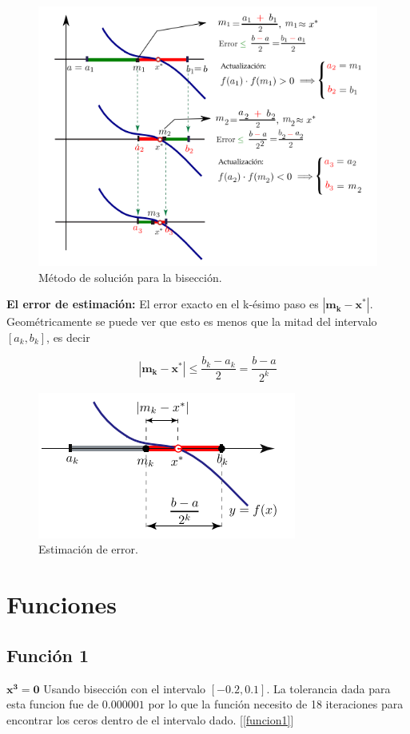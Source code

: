 \documentclass[12pt,a4paper]{article}
\begin{document}
\begin{figure}
\centering
\includegraphics[scale=0.8]{Método_bisección}
\caption{Método de solución para la bisección.}
\end{figure}

\textbf{El error de estimación:}
El error exacto en el k-ésimo
paso es $\mathbf{|m_k -x^*|}$.
 Geométricamente se puede ver que
esto es menos que la mitad del intervalo $[a_k ,b_k ]$, es decir

\begin{equation}
\mathbf{|m_k -x^*|} \leq \frac{b_k - a_k}{2} = \frac{b-a}{2^k}
\end{equation}

\begin{figure}
\centering
\includegraphics[scale=0.8]{error de est}
\caption{Estimación de error.}
\end{figure}

\newpage
\section{Funciones}
\subsection{Función 1}
$\mathbf{ x^3 = 0}$ Usando bisección con el intervalo $[-0.2, 0.1]$.
La tolerancia dada para esta funcion fue de $0.000001$ por lo que la función necesito de 18 iteraciones para encontrar los ceros dentro de el intervalo dado. [\ref{funcion1}] \\
 
\end{document}
